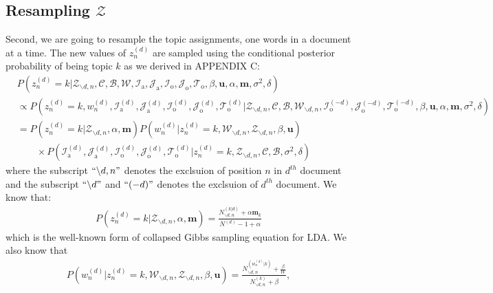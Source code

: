 \documentclass[a4paper]{article}
\begin{document}
  \subsection{Resampling $\mathcal{Z}$}  \label{subsec: Resampling Z}
Second, we are going to resample the topic assignments, one words in a document at a time.  The new values of $z^{(d)}_n$ are sampled using the conditional posterior probability of being topic $k$ as we derived in APPENDIX C:
 \begin{equation}
 \begin{aligned} & 
 P(z^{(d)}_n=k|\mathcal{Z}_{\backslash d, n},   \mathcal{C},   \mathcal{B},\mathcal{W}, \mathcal{I}_{\mbox{a}}, \mathcal{J}_{\mbox{a}}, \mathcal{I}_{\mbox{o}}, \mathcal{J}_{\mbox{o}}, \mathcal{T}_{\mbox{o}}, \beta, \boldsymbol{u}, \alpha, \boldsymbol{m}, \sigma^2, \delta)\\
 & \propto P(z^{(d)}_n=k, w^{(d)}_n, \mathcal{I}^{(d)}_{\mbox{a}}, \mathcal{J}^{(d)}_{\mbox{a}}, \mathcal{I}^{(d)}_{\mbox{o}}, \mathcal{J}^{(d)}_{\mbox{o}}, \mathcal{T}^{(d)}_{\mbox{o}}|\mathcal{Z}_{\backslash d, n}, \mathcal{C},   \mathcal{B},\mathcal{W}_{\backslash d, n}, \mathcal{I}^{(-d)}_{\mbox{o}}, \mathcal{J}^{(-d)}_{\mbox{o}}, \mathcal{T}^{(-d)}_{\mbox{o}}, \beta, \boldsymbol{u}, \alpha, \boldsymbol{m}, \sigma^2, \delta)\\
 &=P(z^{(d)}_n=k|\mathcal{Z}_{\backslash d, n}, \alpha, \boldsymbol{m})P(w^{(d)}_n|z^{(d)}_n=k, \mathcal{W}_{\backslash d, n}, \mathcal{Z}_{\backslash d, n}, \beta, \boldsymbol{u} )\\&\quad\quad \times P(\mathcal{I}^{(d)}_{\mbox{a}}, \mathcal{J}^{(d)}_{\mbox{a}},  \mathcal{I}^{(d)}_{\mbox{o}}, \mathcal{J}^{(d)}_{\mbox{o}}, \mathcal{T}^{(d)}_{\mbox{o}}| z^{(d)}_n=k, \mathcal{Z}_{\backslash d, n}, \mathcal{C}, \mathcal{B}, \sigma^2, \delta)
 \end{aligned}
 \end{equation}
 where the subscript $``{\backslash d, n}"$ denotes the exclsuion of position $n$ in $d^{th}$ document and the subscript $``{\backslash d}"$ and $``{(-d)}"$ denotes the exclsuion of $d^{th}$ document. We know that:
 \begin{equation}
 \begin{aligned} 
 P(z^{(d)}_n=k|\mathcal{Z}_{\backslash d, n}, \alpha, \boldsymbol{m})=\frac{N^{(k|d)}_{\backslash d, n}+\alpha \boldsymbol{m}_k}{N^{(d)}-1+\alpha}
 \end{aligned}
 \end{equation}
 which is the well-known form of collapsed Gibbs sampling equation for LDA. We also know that \begin{equation}
 \begin{aligned} 
 P(w^{(d)}_n|z^{(d)}_n=k, \mathcal{W}_{\backslash d, n}, \mathcal{Z}_{\backslash d, n}, \beta, \boldsymbol{u} )=\frac{N^{(w_n^{(d)}|k)}_{\backslash d, n}+\frac{\beta}{W} }{N^{(k)}_{\backslash d, n}+\beta},
 \end{aligned}
 \end{equation}
\end{document}
